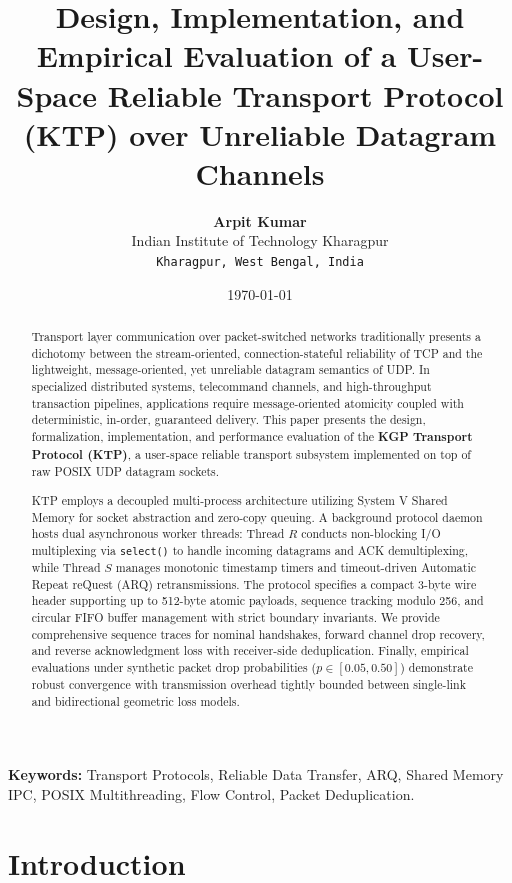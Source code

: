 \documentclass[11pt,a4paper]{article}
\title{
  \vspace{-1.5cm}
  \textbf{\Large Design, Implementation, and Empirical Evaluation of a User-Space Reliable Transport Protocol (KTP) over Unreliable Datagram Channels}
  \vspace{0.4cm}
}
\author{
  \textbf{Arpit Kumar} \\
  Indian Institute of Technology Kharagpur \\
  \texttt{Kharagpur, West Bengal, India}
}
\date{
  \today
}
\begin{document}
\maketitle

\begin{abstract}
Transport layer communication over packet-switched networks traditionally presents a dichotomy between the stream-oriented, connection-stateful reliability of TCP and the lightweight, message-oriented, yet unreliable datagram semantics of UDP. In specialized distributed systems, telecommand channels, and high-throughput transaction pipelines, applications require message-oriented atomicity coupled with deterministic, in-order, guaranteed delivery. This paper presents the design, formalization, implementation, and performance evaluation of the \textbf{KGP Transport Protocol (KTP)}, a user-space reliable transport subsystem implemented on top of raw POSIX UDP datagram sockets. 

KTP employs a decoupled multi-process architecture utilizing System V Shared Memory for socket abstraction and zero-copy queuing. A background protocol daemon hosts dual asynchronous worker threads: Thread $R$ conducts non-blocking I/O multiplexing via \texttt{select()} to handle incoming datagrams and ACK demultiplexing, while Thread $S$ manages monotonic timestamp timers and timeout-driven Automatic Repeat reQuest (ARQ) retransmissions. The protocol specifies a compact 3-byte wire header supporting up to 512-byte atomic payloads, sequence tracking modulo 256, and circular FIFO buffer management with strict boundary invariants. We provide comprehensive sequence traces for nominal handshakes, forward channel drop recovery, and reverse acknowledgment loss with receiver-side deduplication. Finally, empirical evaluations under synthetic packet drop probabilities ($p \in [0.05, 0.50]$) demonstrate robust convergence with transmission overhead tightly bounded between single-link and bidirectional geometric loss models.
\end{abstract}

\vspace{0.2cm}
\noindent\textbf{Keywords:} Transport Protocols, Reliable Data Transfer, ARQ, Shared Memory IPC, POSIX Multithreading, Flow Control, Packet Deduplication.

\section{Introduction}
\label{sec:introduction}
\end{document}
